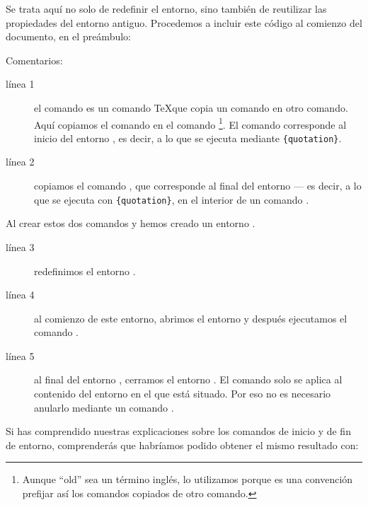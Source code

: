 Se trata aquí no solo de redefinir el entorno, sino también de reutilizar las propiedades del entorno antiguo. Procedemos a incluir este código al comienzo del documento, en el preámbulo:

\begin{latexcode}
\let\oldquotation\quotation
\let\endoldquotation\endquotation
\renewenvironment{quotation}
    {\begin{oldquotation}\singlespace}
        {\end{oldquotation}}
\end{latexcode}

Comentarios: 

\begin{description}
\item[línea 1]el comando  es un comando \TeX que copia un comando en otro comando. Aquí copiamos el comando  en el comando \footnote{Aunque \enquote{old} sea un término inglés, lo utilizamos porque es una convención prefijar así los comandos copiados de otro comando.}. El comando  corresponde al inicio del entorno , es decir, a lo que se ejecuta mediante \verb|{quotation}|.
\item[línea 2]copiamos el comando , que corresponde al final del entorno   --- es decir, a lo que se ejecuta con \verb|{quotation}|, en el interior de un comando .
\end{description}

Al crear estos dos comandos  y  hemos creado un entorno .

\begin{description}
\item[línea 3]redefinimos el entorno .
\item[línea 4]al comienzo de este entorno, abrimos el entorno  y después ejecutamos el comando .
\item[línea 5]al final del entorno , cerramos el entorno . El comando  solo se aplica al contenido del entorno en el que está situado. Por eso no es necesario anularlo mediante un comando . 
\end{description}

\begin{plusloins}
Si has comprendido nuestras explicaciones sobre los comandos de inicio y de fin de entorno, comprenderás que habríamos podido obtener el mismo resultado con:

\begin{latexcode}
\let\endoldquotation\endquotation
\renewcommand{\quotation}{\oldquotation\singlespace}
\end{latexcode}

\end{plusloins}

